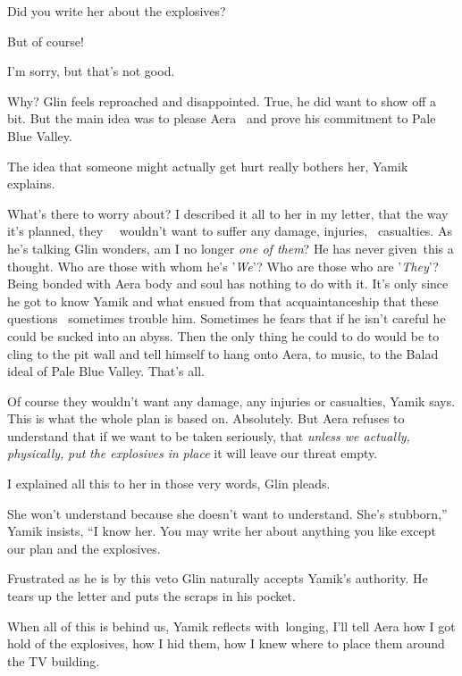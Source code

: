 \documentclass[letterpaper]{article}
\begin{document}
{\textquotedbl}Did you write her about the explosives?{\textquotedbl} 

{\textquotedbl}But of course!{\textquotedbl}~ 

{\textquotedbl}I'm sorry, but that's not good.{\textquotedbl} 

{\textquotedbl}Why?{\textquotedbl} Glin feels reproached and disappointed. True, he did want to show off a bit. But the
main idea was to please Aera \ and prove his commitment to Pale Blue Valley. 

{\textquotedbl}The idea that someone might actually get hurt really bothers her,{\textquotedbl} Yamik explains.

{\textquotedbl}What's there to worry about? I described it all to her in my letter, that the way it's planned, they
\ \ wouldn't want to suffer any damage, injuries, \ casualties.{\textquotedbl} As he's talking Glin wonders, am I no
longer \textit{one of them}?{ }He has never given~this a thought. Who are those
with whom he's '\textit{We}{}'? Who are those who are '\textit{They}{}'? Being bonded with Aera body and soul has
nothing to do with it. It's only since he got to know Yamik and what ensued from that acquaintanceship that these
questions \ sometimes trouble him. Sometimes he fears that if he isn't careful he could be sucked into an abyss. Then
the only thing he could to do would be to cling to the pit wall and tell himself to hang onto Aera, to music, to the
Balad ideal of Pale Blue Valley. That's all. 

{\textquotedbl}Of course they wouldn't want any damage, any injuries or casualties,{\textquotedbl} Yamik says.
{\textquotedbl}This is what the whole plan is based on. Absolutely. But Aera refuses to understand that if we want to
be taken seriously, that \textit{unless we actually, physically,} \textit{put} \textit{the explosives in} \textit{place
}it will leave our threat empty.{\textquotedbl} 

{\textquotedbl}I explained all this to her in those very words,{\textquotedbl} Glin pleads. 

{\textquotedbl}She won't understand because she doesn't want to understand. She's stubborn,'' Yamik insists, ``I know
her. You may write her about anything you like except our plan and the explosives.{\textquotedbl} 

Frustrated as he is by this veto Glin naturally accepts Yamik's authority. He tears up the letter and puts the scraps in
his pocket. 

When all of this is behind us, Yamik reflects with~longing, I'll tell Aera how I got hold of the explosives, how I hid
them, how I knew where to place them around the TV building.
\end{document}
